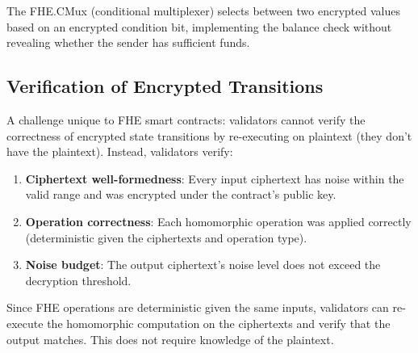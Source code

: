 The \textsf{FHE.CMux} (conditional multiplexer) selects between two encrypted values
based on an encrypted condition bit, implementing the balance check without revealing
whether the sender has sufficient funds.

\subsection{Verification of Encrypted Transitions}

A challenge unique to FHE smart contracts: validators cannot verify the correctness
of encrypted state transitions by re-executing on plaintext (they don't have the
plaintext). Instead, validators verify:

\begin{enumerate}[leftmargin=2em]
  \item \textbf{Ciphertext well-formedness}: Every input ciphertext has noise within
        the valid range and was encrypted under the contract's public key.
  \item \textbf{Operation correctness}: Each homomorphic operation was applied
        correctly (deterministic given the ciphertexts and operation type).
  \item \textbf{Noise budget}: The output ciphertext's noise level does not exceed
        the decryption threshold.
\end{enumerate}

Since FHE operations are deterministic given the same inputs, validators can re-execute
the homomorphic computation on the ciphertexts and verify that the output matches.
This does not require knowledge of the plaintext.

